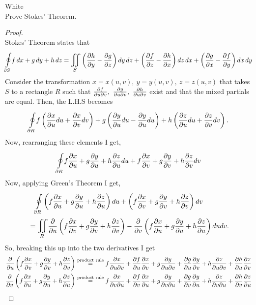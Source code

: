 \documentclass[titlepage]{article}
\begin{document}
\fancyhf{}
\cfoot{\thepage}

\begin{cproblem}{1}{White}\ \\
Prove Stokes' Theorem.
\end{cproblem}
\begin{proof}\ \\
Stokes' Theorem states that 
$$\boint{\p S}{}f\,dx + g\,dy + h\,dz = \bigiint{S}{} \left( \frac{\p h}{\p y} - \frac{\p g}{\p z} \right)dy\,dz + \left( \frac{\p f}{\p z} - \frac{\p h}{\p x} \right)dz\,dx + \left( \frac{\p g}{\p x} - \frac{\p f}{\p y} \right)dx\,dy$$
Consider the transformation $x = x(u,v), \ y= y(u,v), \ z= z(u,v)$ that takes $S$ to a rectangle $R$ such that $\frac{\partial f}{\partial u \partial v}, \ \frac{\partial g}{\partial u \partial v}, \ \frac{\partial h}{\partial u \partial v}$ exist and that the mixed partials are equal. Then, the L.H.S becomes
$$\boint{\p R}{} f \left(\frac{\p x}{\p u} du + \frac{\p x}{\p v} dv\right) + g \left(\frac{\p y}{\p u}du - \frac{\p y}{\p u} du \right) + h \left(\frac{\p z}{\p u}du + \frac{\p z}{\p v}dv \right).$$
Now, rearranging these elements I get,
$$\boint{\p R}{}f\frac{\p x}{\p u} + g\frac{\p y}{\p u} + h\frac{\p z}{\p u} du + f\frac{\p x}{\p v} + g\frac{\p y}{\p v} + h\frac{\p z}{\p v} dv$$
Now, applying Green's Theorem I get,
\begin{align*}
&\quad \boint{\p R}{}\left(f\frac{\p x}{\p u} + g\frac{\p y}{\p u} + h\frac{\p z}{\p u}\right) du + \left(f\frac{\p x}{\p v} + g\frac{\p y}{\p v} + h\frac{\p z}{\p v}\right) dv \\
&= \bigiint{R}{} \frac{\p}{\p u} \left(  f\frac{\p x}{\p v} + g\frac{\p y}{\p v} + h\frac{\p z}{\p v} \right) - \frac{\p }{\p v} \left( f\frac{\p x}{\p u} + g\frac{\p y}{\p u} + h\frac{\p z}{\p u}\right)dudv.
\end{align*}
So, breaking this up into the two derivatives I get
\begin{align*}
\frac{\p }{\p u} \left(  f\frac{\p x}{\p v} + g\frac{\p y}{\p v} + h\frac{\p z}{\p v} \right)  &\overset{\text{product rule}}{=}  f\frac{\p x}{\p u \p v} + \frac{\p f}{\p u}\frac{\p x}{\p v} + g\frac{\p y}{\p u \p v} + \frac{\p g}{\p u}\frac{\p y}{\p v} + h\frac{\p z}{\p u \p v} + \frac{\p h}{\p u}\frac{\p z}{\p v}\\
\frac{\p }{\p v}\left(f\frac{\p x}{\p u} + g\frac{\p y}{\p u} + h\frac{\p z}{\p u}\right) &\overset{\text{product rule}}{=}  f\frac{\p x}{\p v \p u} + \frac{\p f}{\p v}\frac{\p x}{\p u} + g\frac{\p y}{\p v \p u} + \frac{\p g}{\p v}\frac{\p y}{\p u} + h\frac{\p z}{\p v \p u} + \frac{\p h}{\p v}\frac{\p z}{\p u}\\

\end{align*}
\end{proof}
\end{document}

